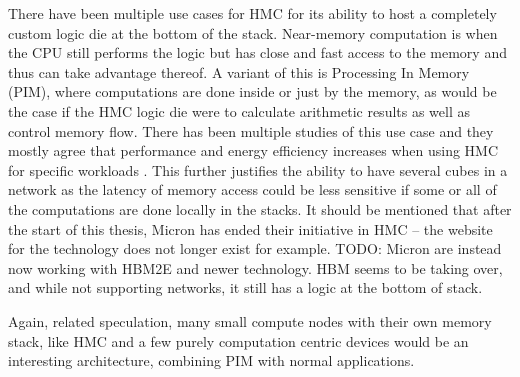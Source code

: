 There have been multiple use cases for HMC for its ability to host a completely custom logic die at the bottom of the stack. Near-memory computation is when the CPU still performs the logic but has close and fast access to the memory and thus can take advantage thereof. A variant of this is Processing In Memory (PIM), where computations are done inside or just by the memory, as would be the case if the HMC logic die were to calculate arithmetic results as well as control memory flow. There has been multiple studies of this use case and they mostly agree that performance and energy efficiency increases when using HMC for specific workloads \cite{7917248} \cite{Min:2019:NEH:3287624.3287642} \cite{7804052} \cite{oliveira2017nim}. This further justifies the ability to have several cubes in a network as the latency of memory access could be less sensitive if some or all of the computations are done locally in the stacks. It should be mentioned that after the start of this thesis, Micron has ended their initiative in HMC -- the website for the technology does not longer exist for example. TODO: Micron are instead now working with HBM2E and newer technology. HBM seems to be taking over, and while not supporting networks, it still has a logic at the bottom of stack. 

Again, related speculation, many small compute nodes with their own memory stack, like HMC and a few purely computation centric devices would be an interesting architecture, combining PIM with normal applications.
